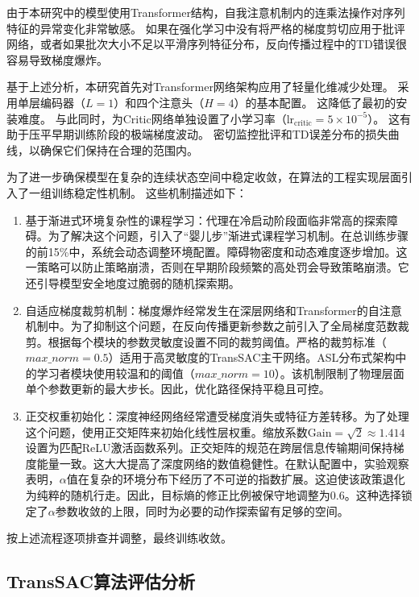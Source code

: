 由于本研究中的模型使用Transformer结构，自我注意机制内的连乘法操作对序列特征的异常变化非常敏感。 如果在强化学习中没有将严格的梯度剪切应用于批评网络，或者如果批次大小不足以平滑序列特征分布，反向传播过程中的TD错误很容易导致梯度爆炸。

基于上述分析，本研究首先对Transformer网络架构应用了轻量化维减少处理。 采用单层编码器（$L=1$）和四个注意头（$H=4$）的基本配置。 这降低了最初的安装难度。 与此同时，为Critic网络单独设置了小学习率（$\mathrm{lr}_{\mathrm{critic}}=5 \times 10^{-5}$）。 这有助于压平早期训练阶段的极端梯度波动。 密切监控批评和TD误差分布的损失曲线，以确保它们保持在合理的范围内。

为了进一步确保模型在复杂的连续状态空间中稳定收敛，在算法的工程实现层面引入了一组训练稳定性机制。 这些机制描述如下：

\begin{enumerate}

\item 基于渐进式环境复杂性的课程学习：代理在冷启动阶段面临非常高的探索障碍。为了解决这个问题，引入了“婴儿步”渐进式课程学习机制。在总训练步骤的前15\%中，系统会动态调整环境配置。障碍物密度和动态难度逐步增加。这一策略可以防止策略崩溃，否则在早期阶段频繁的高处罚会导致策略崩溃。它还引导模型安全地度过脆弱的随机探索期。

\item 自适应梯度裁剪机制：梯度爆炸经常发生在深层网络和Transformer的自注意机制中。\cite{decision-transformer}为了抑制这个问题，在反向传播更新参数之前引入了全局梯度范数裁剪。根据每个模块的参数灵敏度设置不同的裁剪阈值。严格的裁剪标准（$max\_norm=0.5$）适用于高灵敏度的TransSAC主干网络。ASL分布式架构中的学习者模块使用较温和的阈值（$max\_norm=10$）。该机制限制了物理层面单个参数更新的最大步长。因此，优化路径保持平稳且可控。

\item 正交权重初始化：深度神经网络经常遭受梯度消失或特征方差转移。为了处理这个问题，使用正交矩阵来初始化线性层权重。缩放系数$\text{Gain} = \sqrt{2} \approx 1.414$设置为匹配ReLU激活函数系列。正交矩阵的规范在跨层信息传输期间保持梯度能量一致。这大大提高了深度网络的数值稳健性。在默认配置中，实验观察表明，$\alpha$值在复杂的环境分布下经历了不可逆的指数扩展。这迫使该政策退化为纯粹的随机行走。因此，目标熵的修正比例被保守地调整为0.6。这种选择锁定了$\alpha$参数收敛的上限，同时为必要的动作探索留有足够的空间。

\end{enumerate}

按上述流程逐项排查并调整，最终训练收敛。

\subsection{TransSAC算法评估分析}

